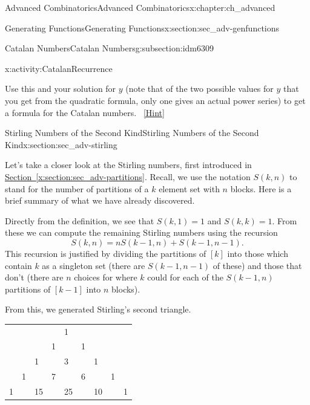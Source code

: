 \documentclass[oneside,10pt,]{book}
\numberwithin{equation}{chapter}
\begin{document}
\begin{chapterptx}{Advanced Combinatorics}{}{Advanced Combinatorics}{}{}{x:chapter:ch_advanced}
\begin{sectionptx}{Generating Functions}{}{Generating Functions}{}{}{x:section:sec_adv-genfunctions}
\begin{subsectionptx}{Catalan Numbers}{}{Catalan Numbers}{}{}{g:subsection:idm6309}
\begin{activity}{}{x:activity:CatalanRecurrence}
\begin{enumerate}[font=\bfseries,label=(\alph*),ref=\alph*]
\begin{equation*}
\end{equation*}
Use this and your solution for \(y\) (note that of the two possible values for \(y\) that you get from the quadratic formula, only one gives an actual power series) to get a formula for the Catalan numbers.%
\qquad~\hfill{\tiny\hyperlink{g:hint:idm6347-back}{[Hint]}}\end{enumerate}
\end{activity}
\end{subsectionptx}
\end{sectionptx}
%
%
\typeout{************************************************}
\typeout{************************************************}
%
\begin{sectionptx}{Stirling Numbers of the Second Kind}{}{Stirling Numbers of the Second Kind}{}{}{x:section:sec_adv-stirling}
\begin{introduction}{}%
Let's take a closer look at the Stirling numbers, first introduced in \hyperref[x:section:sec_adv-partitions]{Section~\ref{x:section:sec_adv-partitions}}.  Recall, we use the notation \(S(k,n)\) to stand for the number of partitions of a \(k\) element set with \(n\) blocks.  Here is a brief summary of what we have already discovered.%
\par
Directly from the definition, we see that \(S(k,1) = 1\) and \(S(k,k) = 1\).  From these we can compute the remaining Stirling numbers using the recursion%
\begin{equation*}
S(k,n) = nS(k-1,n) + S(k-1, n-1).
\end{equation*}
This recursion is justified by dividing the partitions of \([k]\) into those which contain \(k\) as a singleton set (there are \(S(k-1, n-1)\) of these) and those that don't (there are \(n\) choices for where \(k\) could for each of the \(S(k-1, n)\) partitions of \([k-1]\) into \(n\) blocks).%
\par
From this, we generated Stirling's second triangle.%
\begin{sidebyside}{1}{0.25}{0.25}{0}%
\begin{sbspanel}{0.5}%
{\centering%
\begin{tabular}{lllllllll}
&&&&1&&&&\tabularnewline[0pt]
&&&1&&1&&&\tabularnewline[0pt]
&&1&&3&&1&&\tabularnewline[0pt]
&1&&7&&6&&1&\tabularnewline[0pt]
1&&15&&25&&10&&1
\end{tabular}
\par}
\end{sbspanel}%

\end{sidebyside}
\end{introduction}
\end{sectionptx}
\end{chapterptx}
\end{document}
